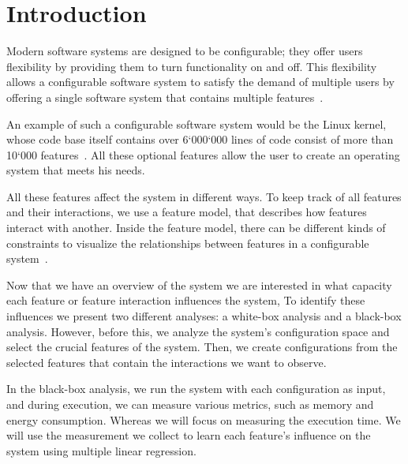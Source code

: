 \chapter{Introduction}\label{ch:introduction}

Modern software systems are designed to be configurable; they offer users flexibility by providing them to turn functionality on and off.
This flexibility allows a configurable software system to satisfy the demand of multiple users by offering a single software system that 
contains multiple features~\cite{Feature-Oriented-Software-Product-Lines}. 

An example of such a configurable software system would be the Linux kernel, whose code base itself contains over 6`000`000 lines of code consist of more 
than 10`000 features~\cite{Linux-Kernel}. 
All these optional features allow the user to create an operating system that meets his needs. 

All these features affect the system in different ways. To keep track of all features and their interactions, we use a feature model, 
that describes how features interact with another.
Inside the feature model, there can be different kinds of constraints to visualize the relationships 
between features in a configurable system~\cite{Feature-Oriented-Software-Product-Lines}. 

Now that we have an overview of the system we are interested in what capacity each feature or feature interaction influences the system,
To identify these influences we present two different analyses: a white-box analysis and a black-box analysis.
However, before this, we analyze the system's configuration space and select the crucial features of the system.
Then, we create configurations from the selected features that contain the interactions we want to observe.

In the black-box analysis, we run the system with each configuration as input, and during execution, we can measure various metrics, such as memory and energy consumption.
Whereas we will focus on measuring the execution time. We will use the measurement we collect to learn each feature's influence on the system 
using multiple linear regression.

